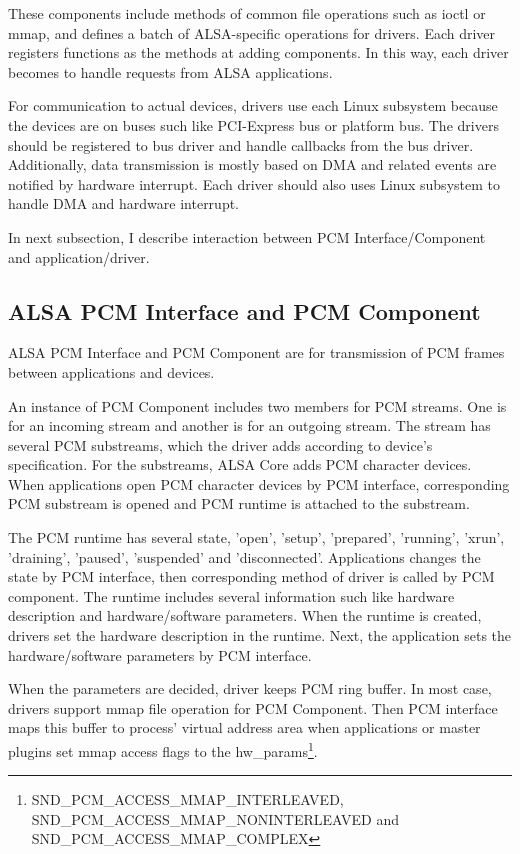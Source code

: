 \documentclass[onecolumn]{article}
\begin{document}
These components include methods of common file operations such as ioctl or mmap, and defines a batch of ALSA-specific operations for drivers. Each driver registers functions as the methods at adding components. In this way, each driver becomes to handle requests from ALSA applications.

For communication to actual devices, drivers use each Linux subsystem because the devices are on buses such like PCI-Express bus or platform bus. The drivers should be registered to bus driver and handle callbacks from the bus driver. Additionally, data transmission is mostly based on DMA and related events are notified by hardware interrupt. Each driver should also uses Linux subsystem to handle DMA and hardware interrupt.

In next subsection, I describe interaction between PCM Interface/Component and application/driver.

\subsection{ALSA PCM Interface and PCM Component}
\label{sec:alsa-pcm}

ALSA PCM Interface and PCM Component are for transmission of PCM frames between applications and devices.

An instance of PCM Component includes two members for PCM streams. One is for an incoming stream and another is for an outgoing stream. The stream has several PCM substreams, which the driver adds according to device's specification. For the substreams, ALSA Core adds PCM character devices. When applications open PCM character devices by PCM interface, corresponding PCM substream is opened and PCM runtime is attached to the substream.

The PCM runtime has several state, 'open', 'setup', 'prepared', 'running', 'xrun', 'draining', 'paused', 'suspended' and 'disconnected'\cite{alsa-lib}. Applications changes the state by PCM interface, then corresponding method of driver is called by PCM component. The runtime includes several information such like hardware description and hardware/software parameters. When the runtime is created, drivers set the hardware description in the runtime. Next, the application sets the hardware/software parameters by PCM interface.

When the parameters are decided, driver keeps PCM ring buffer. In most case, drivers support mmap file operation for PCM Component. Then PCM interface maps this buffer to process' virtual address area when applications or master plugins set mmap access flags to the hw\_params\footnote{SND\_PCM\_ACCESS\_MMAP\_INTERLEAVED, SND\_PCM\_ACCESS\_MMAP\_NONINTERLEAVED and SND\_PCM\_ACCESS\_MMAP\_COMPLEX}.
\end{document}
